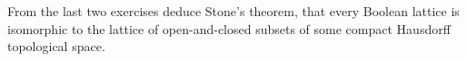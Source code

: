 \begin{exercise}
From the last two exercises deduce Stone's theorem, that every Boolean lattice is isomorphic to the lattice of open-and-closed subsets of some compact Hausdorff topological space.
\end{exercise}